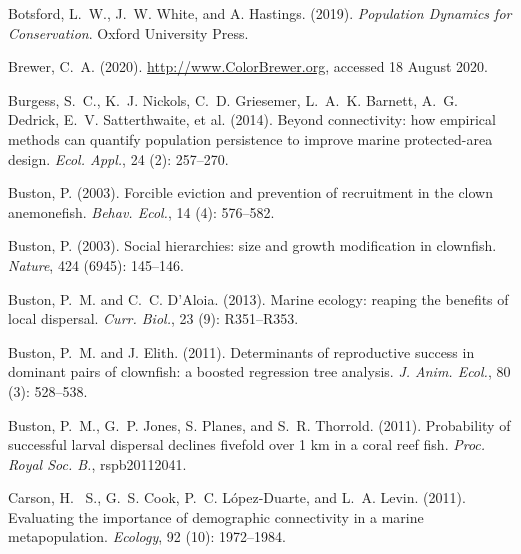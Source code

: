 \documentclass[12pt, oneside]{article}   	%
\begin{document}
\begin{thebibliography}{66}
Botsford, L.~W., J.~W. White, and A. Hastings. (2019).
\newblock \emph{Population Dynamics for Conservation}.
\newblock Oxford University Press.

Brewer, C.~A. (2020). 
\newblock \url{http://www.ColorBrewer.org},
\newblock accessed 18 August 2020.

Burgess, S.~C., K.~J. Nickols, C.~D. Griesemer, L.~A.~K. Barnett,
  A.~G. Dedrick, E.~V. Satterthwaite, et al. (2014).
\newblock Beyond connectivity: how empirical methods can quantify population
  persistence to improve marine protected-area design.
\newblock \emph{Ecol. Appl.}, 24 (2): 257--270.

Buston, P. (2003{}).
\newblock Forcible eviction and prevention of recruitment in the clown
  anemonefish.
\newblock \emph{Behav. Ecol.}, 14 (4): 576--582.

Buston, P. (2003{}).
\newblock Social hierarchies: size and growth modification in clownfish.
\newblock \emph{Nature}, 424 (6945): 145--146.

Buston, P.~M. and C.~C. D'Aloia. (2013).
\newblock Marine ecology: reaping the benefits of local dispersal.
\newblock \emph{Curr. Biol.}, 23 (9): R351--R353.

Buston, P.~M. and J. Elith. (2011).
\newblock Determinants of reproductive success in dominant pairs of clownfish:
  a boosted regression tree analysis.
\newblock \emph{J. Anim. Ecol.}, 80 (3): 528--538.

Buston, P.~M., G.~P. Jones, S. Planes, and S.~R. Thorrold. (2011).
\newblock Probability of successful larval dispersal declines fivefold over 1
  km in a coral reef fish.
\newblock \emph{Proc. Royal Soc. B.}, rspb20112041.

Carson, H.~ S., G.~S. Cook, P.~C. L{\'o}pez-Duarte, and L.~A. Levin. (2011).
\newblock Evaluating the importance of demographic connectivity in a marine
  metapopulation.
\newblock \emph{Ecology}, 92 (10): 1972--1984.


\end{thebibliography}
\end{document}
